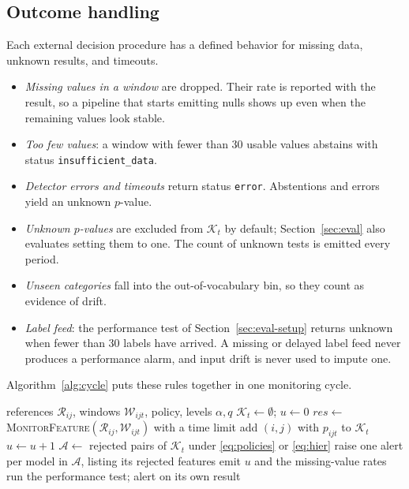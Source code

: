 \documentclass[journal]{IEEEtran}
\begin{document}
\subsection{Outcome handling}

Each external decision procedure has a defined behavior for missing data, unknown results, and timeouts.
\begin{itemize}
\item \emph{Missing values in a window} are dropped. Their rate is reported with the result, so a pipeline that starts emitting nulls shows up even when the remaining values look stable.
\item \emph{Too few values}: a window with fewer than 30 usable values abstains with status \texttt{insufficient\_data}.
\item \emph{Detector errors and timeouts} return status \texttt{error}. Abstentions and errors yield an unknown $p$-value.
\item \emph{Unknown $p$-values} are excluded from $\mathcal{K}_t$ by default; Section~\ref{sec:eval} also evaluates setting them to one. The count of unknown tests is emitted every period.
\item \emph{Unseen categories} fall into the out-of-vocabulary bin, so they count as evidence of drift.
\item \emph{Label feed}: the performance test of Section~\ref{sec:eval-setup} returns unknown when fewer than 30 labels have arrived. A missing or delayed label feed never produces a performance alarm, and input drift is never used to impute one.
\end{itemize}
Algorithm~\ref{alg:cycle} puts these rules together in one monitoring cycle.

\begin{algorithm}[!t]
\caption{One monitoring period for a portfolio}
\label{alg:cycle}
\begin{algorithmic}[1]
\Require references $\mathcal{R}_{ij}$, windows $\mathcal{W}_{ijt}$, policy, levels $\alpha,q$
\State $\mathcal{K}_t\gets\emptyset$; $u\gets0$
  \State $res\gets$ \textsc{MonitorFeature}$(\mathcal{R}_{ij},\mathcal{W}_{ijt})$ with a time limit
   \State add $(i,j)$ with $p_{ijt}$ to $\mathcal{K}_t$
  \Else \State $u\gets u+1$ 
  \EndIf
\EndFor
\State $\mathcal{A}\gets$ rejected pairs of $\mathcal{K}_t$ under \eqref{eq:policies} or \eqref{eq:hier}
\State raise one alert per model in $\mathcal{A}$, listing its rejected features
\State emit $u$ and the missing-value rates
  \State run the performance test; alert on its own result
\EndFor
\end{algorithmic}
\end{algorithm}
\end{document}
